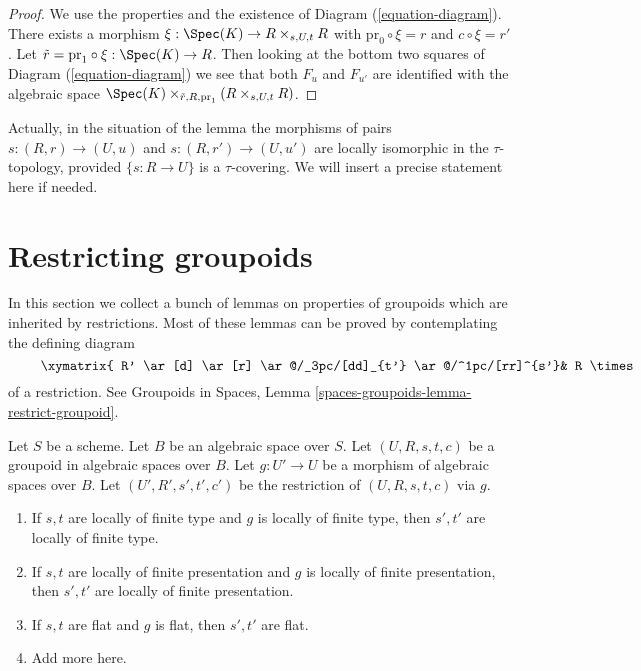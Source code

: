 \begin{proof}
We use the properties and the existence of
Diagram (\ref{equation-diagram}).
There exists a morphism $\xi : \Spec(K) \to R \times_{s, U, t} R$
with $\text{pr}_0 \circ \xi = r$ and $c \circ \xi = r'$.
Let $\tilde r = \text{pr}_1 \circ \xi : \Spec(K) \to R$.
Then looking at the bottom two squares of
Diagram (\ref{equation-diagram})
we see that both $F_u$ and $F_{u'}$ are identified with the algebraic space
$\Spec(K) \times_{\tilde r, R, \text{pr}_1} (R \times_{s, U, t} R)$.
\end{proof}

\noindent
Actually, in the situation of the lemma the morphisms of pairs
$s : (R, r) \to (U, u)$ and $s : (R, r') \to (U, u')$ are
locally isomorphic in the $\tau$-topology, provided $\{s: R \to U\}$ is a
$\tau$-covering. We will insert a precise statement here if needed.








\section{Restricting groupoids}
\label{section-restricting-groupoids}

\noindent
In this section we collect a bunch of lemmas on
properties of groupoids which are inherited by restrictions.
Most of these lemmas can be proved by contemplating the
defining diagram
\begin{equation}
\label{equation-restriction}
\vcenter{
\xymatrix{
R' \ar[d] \ar[r] \ar@/_3pc/[dd]_{t'} \ar@/^1pc/[rr]^{s'}&
R \times_{s, U} U' \ar[r] \ar[d] &
U' \ar[d]^g \\
U' \times_{U, t} R \ar[d] \ar[r] &
R \ar[r]^s \ar[d]_t &
U \\
U' \ar[r]^g &
U
}
}
\end{equation}
of a restriction. See
Groupoids in Spaces, Lemma \ref{spaces-groupoids-lemma-restrict-groupoid}.

\begin{lemma}
\label{lemma-restrict-preserves-type}
Let $S$ be a scheme. Let $B$ be an algebraic space over $S$.
Let $(U, R, s, t, c)$ be a groupoid in algebraic spaces over $B$.
Let $g : U' \to U$ be a morphism of algebraic spaces over $B$.
Let $(U', R', s', t', c')$ be the restriction of
$(U, R, s, t, c)$ via $g$.
\begin{enumerate}
\item If $s, t$ are locally of finite type and $g$ is locally of finite
type, then $s', t'$ are locally of finite type.
\item If $s, t$ are locally of finite presentation and $g$ is locally of finite
presentation, then $s', t'$ are locally of finite presentation.
\item If $s, t$ are flat and $g$ is flat, then $s', t'$ are flat.
\item Add more here.
\end{enumerate}
\end{lemma}

